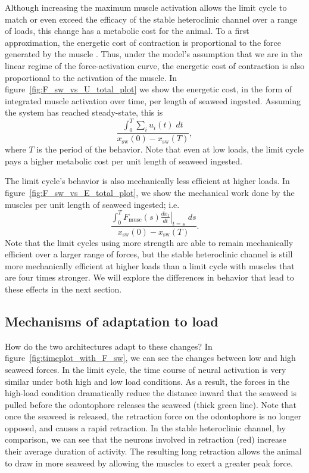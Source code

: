 Although increasing the maximum muscle activation allows the limit cycle to
match or even exceed the efficacy of the stable heteroclinic channel over
a range of loads, this change has a metabolic cost for the animal.  To a first
approximation, the energetic cost of contraction is proportional to the force
generated by the muscle \citep{sacco_effects_1994}.  Thus, under the model's
assumption that we are in the linear regime of the force-activation curve,
the energetic cost of contraction is also proportional to the activation
of the muscle.  In figure~\ref{fig:F_sw_vs_U_total_plot} we show the energetic
cost, in the form of integrated muscle activation over time, per length of
seaweed ingested.  Assuming the system has reached steady-state, this is
\begin{equation}
    \frac{\int_0^{T} \sum_i u_i(t)\;dt}{x_\textrm{sw}(0)-x_\textrm{sw}(T)},
\end{equation}
where $T$ is the period of the behavior.  Note that even at low loads,
the limit cycle pays a higher metabolic cost per unit length of seaweed
ingested.

The limit cycle's behavior is also mechanically less efficient at higher
loads.  In figure~\ref{fig:F_sw_vs_E_total_plot}, we show the mechanical
work done by the muscles per unit length of seaweed ingested; i.e.
\begin{equation}
    \frac{\int_0^{T} F_\textrm{musc}(s)\left.\frac{dx_\textrm{r}}{dt}\right|_{t=s}\;ds}{x_\textrm{sw}(0)-x_\textrm{sw}(T)}.
\end{equation}
Note that the limit cycles using more strength are able to remain
mechanically efficient over a larger range of forces, but the stable
heteroclinic channel is still more mechanically efficient at higher
loads than a limit cycle with muscles that are four times stronger.
We will explore the differences in behavior that lead to these effects
in the next section.

\subsection{Mechanisms of adaptation to load}
\label{sec:sensory_responsiveness}
How do the two architectures adapt to these changes?  In
figure~\ref{fig:timeplot_with_F_sw}, we can see the changes between low and
high seaweed forces.  In the limit cycle, the time course of neural activation is very
similar under both high and low load conditions.  As a result, the forces in
the high-load condition dramatically reduce the distance inward that the
seaweed is pulled before the odontophore releases the seaweed (thick green line).  Note that once
the seaweed is released, the retraction force on the odontophore is no longer
opposed, and causes a rapid retraction.  In the stable heteroclinic channel, by comparison, we can see that the neurons involved in
retraction (red) increase their average duration of activity.  The
resulting long retraction allows the animal to draw in more seaweed by allowing
the muscles to exert a greater peak force.


